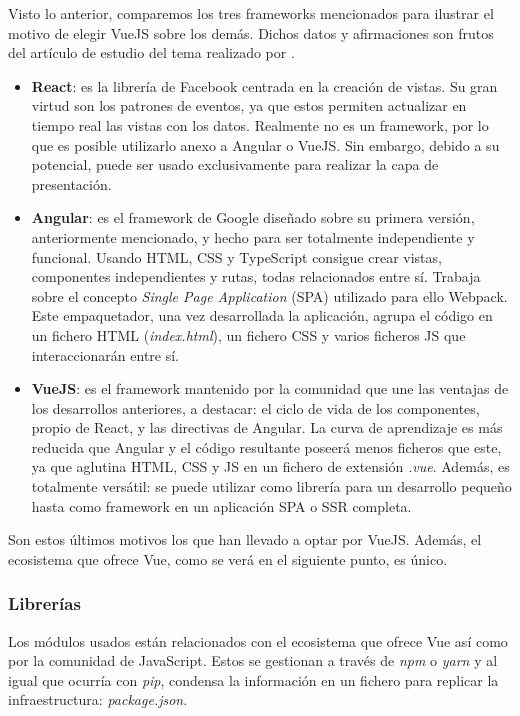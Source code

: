 Visto lo anterior, comparemos los tres frameworks mencionados para ilustrar el motivo de elegir VueJS sobre los demás. Dichos datos y afirmaciones son frutos del artículo de estudio del tema realizado por .

\begin{itemize}
    \item \textbf{React}: es la librería de Facebook centrada en la creación de vistas. Su gran virtud son los patrones de eventos, ya que estos permiten actualizar en tiempo real las vistas con los datos. Realmente no es un framework, por lo que es posible utilizarlo anexo a Angular o VueJS. Sin embargo, debido a su potencial, puede ser usado exclusivamente para realizar la capa de presentación.
    \item \textbf{Angular}: es el framework de Google diseñado sobre su primera versión, anteriormente mencionado, y hecho para ser totalmente independiente y funcional. Usando HTML, CSS y TypeScript consigue crear vistas, componentes independientes y rutas, todas relacionados entre sí. Trabaja sobre el concepto \textit{Single Page Application} (SPA) utilizado para ello Webpack. Este empaquetador, una vez desarrollada la aplicación, agrupa el código en un fichero HTML (\textit{index.html}), un fichero CSS y varios ficheros JS que interaccionarán entre sí.
    \item \textbf{VueJS}: es el framework mantenido por la comunidad que une las ventajas de los desarrollos anteriores, a destacar: el ciclo de vida de los componentes, propio de React, y las directivas de Angular. La curva de aprendizaje es más reducida que Angular y el código resultante poseerá menos ficheros que este, ya que aglutina HTML, CSS y JS en un fichero de extensión \textit{.vue}. Además, es totalmente versátil: se puede utilizar como librería para un desarrollo pequeño hasta como framework en un aplicación SPA o SSR completa.
\end{itemize}

Son estos últimos motivos los que han llevado a optar por VueJS. Además, el ecosistema que ofrece Vue, como se verá en el siguiente punto, es único.

\subsubsection{Librerías}

Los módulos usados están relacionados con el ecosistema que ofrece Vue así como por la comunidad de JavaScript. Estos se gestionan a través de \textit{npm} o \textit{yarn} y al igual que ocurría con \textit{pip}, condensa la información en un fichero para replicar la infraestructura: \textit{package.json}.


